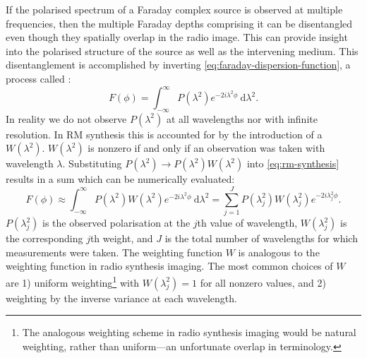         If the polarised spectrum of a Faraday complex source is observed at multiple frequencies, then the multiple Faraday depths comprising it can be disentangled even though they spatially overlap in the radio image. This can provide insight into the polarised structure of the source as well as the intervening medium. This disentanglement is accomplished by inverting \autoref{eq:faraday-dispersion-function}, a process called  \citep{brentjens_faraday_2005}:
        \begin{equation}
            \label{eq:rm-synthesis}
            F(\phi) = \int_{-\infty}^\infty P(\lambda^2) e^{-2i\lambda^2\phi}\ \mathrm{d}\lambda^2.
        \end{equation}
        In reality we do not observe $P(\lambda^2)$ at all wavelengths nor with infinite resolution. In RM synthesis this is accounted for by the introduction of a  \citep[or , e.g.][]{heald09faraday} $W(\lambda^2)$. $W(\lambda^2)$ is nonzero if and only if an observation was taken with wavelength $\lambda$. Substituting $P(\lambda^2) \to P(\lambda^2) W(\lambda^2)$ into \autoref{eq:rm-synthesis} results in a sum which can be numerically evaluated:
        \begin{equation}
            \label{eq:weighted-rm-synthesis}
            F(\phi) \approx \int_{-\infty}^\infty P(\lambda^2) W(\lambda^2) e^{-2i\lambda^2\phi}\ \mathrm{d}\lambda^2 = \sum_{j = 1}^J P(\lambda^2_j) W(\lambda^2_j) e^{-2i\lambda^2_j\phi}.
        \end{equation}
        $P(\lambda^2_j)$ is the observed polarisation at the $j$th value of wavelength, $W(\lambda^2_j)$ is the corresponding $j$th weight, and $J$ is the total number of wavelengths for which measurements were taken. The weighting function $W$ is analogous to the weighting function in radio synthesis imaging. The most common choices of $W$ are 1) uniform weighting\footnote{The analogous weighting scheme in radio synthesis imaging would be natural weighting, rather than uniform---an unfortunate overlap in terminology.} with $W(\lambda_j^2) = 1$ for all nonzero values, and 2) weighting by the inverse variance at each wavelength.

